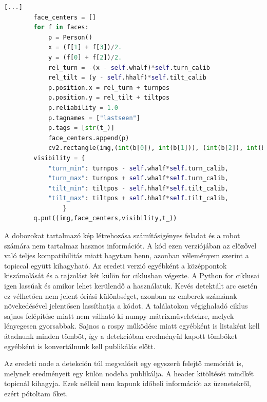 \begin{lstlisting}[language=Python]
    [...]
        face_centers = []
        for f in faces:
            p = Person()
            x = (f[1] + f[3])/2. 
            y = (f[0] + f[2])/2.
            rel_turn = -(x - self.whalf)*self.turn_calib
            rel_tilt = (y - self.hhalf)*self.tilt_calib
            p.position.x = rel_turn + turnpos
            p.position.y = rel_tilt + tiltpos
            p.reliability = 1.0
            p.tagnames = ["lastseen"]
            p.tags = [str(t_)]
            face_centers.append(p)
            cv2.rectangle(img,(int(b[0]), int(b[1])), (int(b[2]), int(b[3])), (255,0,0),4)
        visibility = {
            "turn_min": turnpos - self.whalf*self.turn_calib,
            "turn_max": turnpos + self.whalf*self.turn_calib,
            "tilt_min": tiltpos - self.hhalf*self.tilt_calib,
            "tilt_max": tiltpos + self.hhalf*self.tilt_calib,
                }
        q.put((img,face_centers,visibility,t_))
\end{lstlisting}
A dobozokat tartalmazó kép létrehozása számításigényes feladat és a robot számára nem tartalmaz hasznos információt. A kód ezen verziójában az előzővel való teljes kompatibilitás miatt hagytam benn, azonban véleményem szerint a topiccal együtt kihagyható. Az eredeti verzió egyébként a középpontok kiszámolását és a rajzolást két külön for ciklusban végezte. A Python for ciklusai igen lassúak és amikor lehet kerülendő a használatuk. Kevés detektált arc esetén ez vélhetően nem jelent óriási különbséget, azonban az emberek számának növekedésével jelentősen lassíthatja a kódot. A találatokon végighaladó ciklus sajnos felépítése miatt nem válható ki numpy mátrixműveletekre, melyek lényegesen gyorsabbak. Sajnos a rospy működése miatt egyébként is listaként kell átadnunk minden tömböt, így a detekcióban eredményül kapott tömböket egyébként is konvertálnunk kell publikálás előtt.

Az eredeti node a detekción túl megvalósít egy egyszerű felejtő memóriát is, melynek eredményeit egy külön nodeba publikálja. A header kitöltését mindkét topicnál kihagyja. Ezek nélkül nem kapunk időbeli információt az üzenetekről, ezért pótoltam őket.


